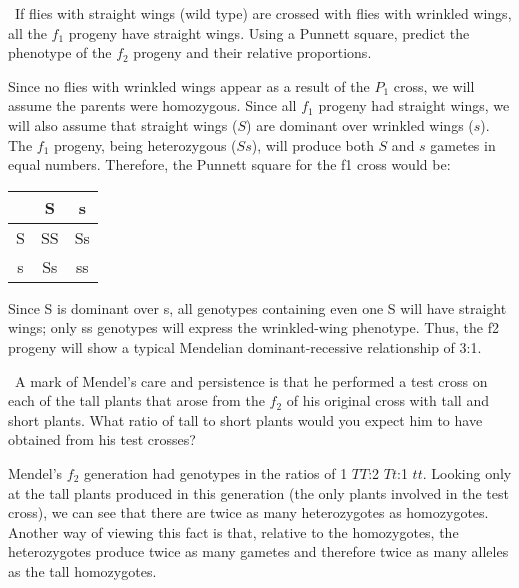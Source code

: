 \documentclass[exam,addpoints,noanswers]{exam}
\begin{document}
\begin{questions}
\clearpage
\question[23] If flies with straight wings (wild type) are crossed with flies with wrinkled wings, all the $f_1$ progeny have straight wings. Using a Punnett square, predict the phenotype of the $f_2$ progeny and their relative proportions.
\begin{solution}
Since no flies with wrinkled wings appear as a result of the $P_1$ cross, we will assume the parents were homozygous. Since all $f_1$ progeny had straight wings, we will also assume that straight wings ($S$) are dominant over wrinkled wings ($s$). The $f_1$ progeny, being heterozygous ($Ss$), will produce both $S$ and $s$ gametes in equal numbers. Therefore, the Punnett square for the f1 cross would be:
\begin{center}
\begin{tabular}{|c|c|c|}
\hline
& S & s \\
\hline
S & SS & Ss \\
\hline
s & Ss & ss \\
\hline
\end{tabular}
\end{center}
Since S is dominant over s, all genotypes containing even one S will have straight wings; only ss genotypes will express the wrinkled-wing phenotype. Thus, the f2 progeny will show a typical Mendelian dominant-recessive relationship of 3:1.
\end{solution}

\clearpage
\question[22] A mark of Mendel’s care and persistence is that he performed a test cross on each of the tall plants that arose from the $f_2$ of his original cross with tall and short plants. What ratio of tall to short plants would you expect him to have obtained from his test crosses?
\begin{solution}
Mendel’s $f_2$ generation had genotypes in the ratios of 1 $TT$:2 $Tt$:1 $tt$. Looking only at the tall plants produced in this generation (the only plants involved in the test cross), we can see that there are twice as many heterozygotes as homozygotes. Another way of viewing this fact is that, relative to the homozygotes, the heterozygotes produce twice as many gametes and therefore twice as many alleles as the tall homozygotes.


\end{solution}
\end{questions}
\end{document}
